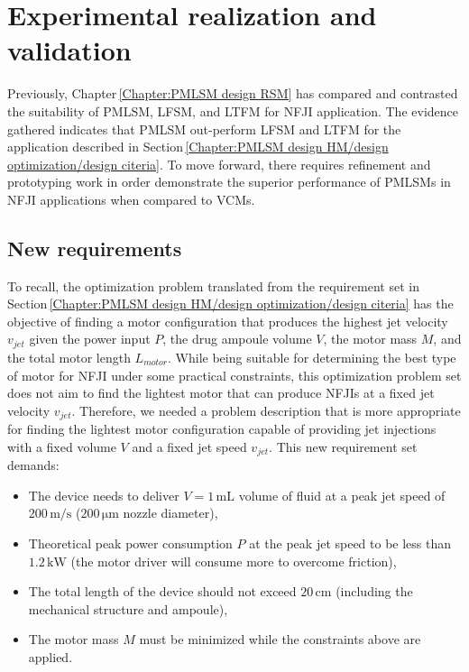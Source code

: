 \chapter{Experimental realization and validation}   \label{Chapter:experiment}
    
    
    Previously, Chapter\,\ref{Chapter:PMLSM design RSM} has compared and contrasted the suitability of \acf{PMLSM}, \acf{LFSM}, and \acf{LTFM} for \acf{NFJI} application. The evidence gathered indicates that \acs{PMLSM} out-perform \acs{LFSM} and \acs{LTFM} for the application described in Section\,\ref{Chapter:PMLSM design HM/design optimization/design citeria}. To move forward, there requires refinement and prototyping work in order demonstrate the superior performance of \acsp{PMLSM} in \acs{NFJI} applications when compared to \acfp{VCM}.  
    
    
\section{New requirements}                          \label{Chapter:experiment/requirements}
    
    To recall, the optimization problem translated from the requirement set in Section\,\ref{Chapter:PMLSM design HM/design optimization/design citeria} has the objective of finding a motor configuration that produces the highest jet velocity $v_{jet}$ given the power input $P$, the drug ampoule volume $V$, the motor mass $M$, and the total motor length $L_{motor}$. While being suitable for determining the best type of motor for \acs{NFJI} under some practical constraints, this optimization problem set does not aim to find the lightest motor that can produce \acsp{NFJI} at a fixed jet velocity $v_{jet}$. Therefore, we needed a problem description that is more appropriate for finding the lightest motor configuration capable of providing jet injections with a fixed volume $V$ and a fixed jet speed $v_{jet}$. This new requirement set demands:
    
    
    \begin{itemize}
        \item The device needs to deliver $V = 1\,\mathrm{mL}$ volume of fluid at a peak jet speed of $200\,\mathrm m/\mathrm s$ ($200\,\mathrm{\mu m}$ nozzle diameter),
        \item Theoretical peak power consumption $P$ at the peak jet speed to be less than $1.2\,\mathrm{kW}$ (the motor driver will consume more to overcome friction),
        \item The total length of the device should not exceed $20\,\mathrm{cm}$  (including the mechanical structure and ampoule),
        \item The motor mass $M$ must be minimized while the constraints above are applied.
    \end{itemize}
    
